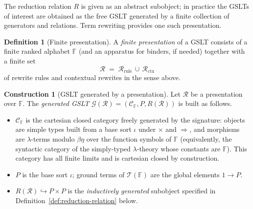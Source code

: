 \documentclass[11pt]{article}
\theoremstyle{plain}
\theoremstyle{definition}
\newtheorem{definition}[theorem]{Definition}
\newtheorem{construction}[theorem]{Construction}
\theoremstyle{remark}
\newcommand{\Terms}{\mathcal{T}}
\begin{document}
The reduction relation $R$ is given as an abstract subobject; in
practice the GSLTs of interest are obtained as the free GSLT generated
by a finite collection of generators and relations. Term rewriting
provides one such presentation.

\begin{definition}[Finite presentation]\label{def:presentation}
A \emph{finite presentation} of a GSLT consists of a finite ranked
alphabet $\mathbb{F}$ (and an apparatus for binders, if needed)
together with a finite set
\[
  \mathcal{R} \;=\; \mathcal{R}_{\mathrm{rule}}
                    \,\cup\, \mathcal{R}_{\mathrm{ctx}}
\]
of rewrite rules and contextual rewrites in the sense above.
\end{definition}

\begin{construction}[GSLT generated by a presentation]\label{constr:gslt}
Let $\mathcal{R}$ be a presentation over $\mathbb{F}$. The
\emph{generated GSLT}
$\mathcal{G}(\mathcal{R}) = (\mathcal{C}_{\mathbb{F}}, P, R(\mathcal{R}))$
is built as follows.
\begin{itemize}[leftmargin=*]
  \item $\mathcal{C}_{\mathbb{F}}$ is the cartesian closed category
        freely generated by the signature: objects are simple types
        built from a base sort $\iota$ under $\times$ and $\Rightarrow$,
        and morphisms are $\lambda$-terms modulo $\beta\eta$ over the
        function symbols of $\mathbb{F}$ (equivalently, the syntactic
        category of the simply-typed $\lambda$-theory whose constants
        are $\mathbb{F}$). This category has all finite limits and is
        cartesian closed by construction.
  \item $P$ is the base sort $\iota$; ground terms of $\Terms(\mathbb{F})$
        are the global elements $1 \to P$.
  \item $R(\mathcal{R}) \hookrightarrow P \times P$ is the
        \emph{inductively generated} subobject specified in
        Definition~\ref{def:reduction-relation} below.
\end{itemize}
\end{construction}
\end{document}

